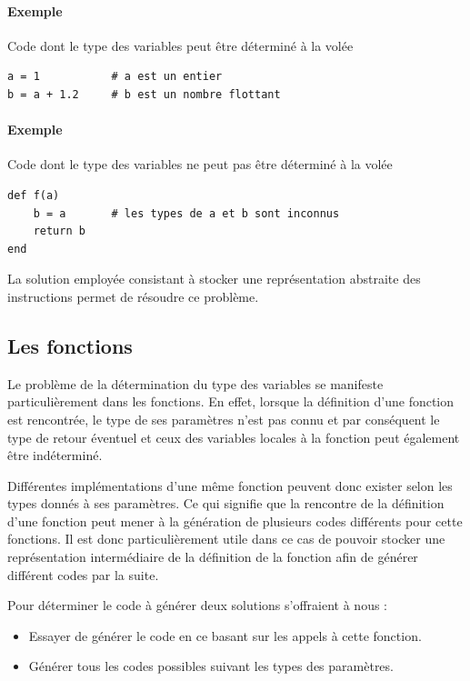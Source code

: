 \documentclass[12pt]{article}
\begin{document}
\paragraph{Exemple} Code dont le type des variables peut être déterminé à la volée
\begin{verbatim}
a = 1           # a est un entier
b = a + 1.2     # b est un nombre flottant
\end{verbatim}

\paragraph{Exemple} Code dont le type des variables ne peut pas être déterminé à la volée
\begin{verbatim}
def f(a)
    b = a       # les types de a et b sont inconnus
    return b
end 
\end{verbatim}

La solution employée consistant à stocker une représentation abstraite des instructions permet de résoudre ce problème.

\subsection{Les fonctions}

Le problème de la détermination du type des variables se manifeste particulièrement dans les fonctions. En effet, lorsque la définition d'une fonction est rencontrée, le type de ses paramètres n'est pas connu et par conséquent le type de retour éventuel et ceux des variables locales à la fonction peut également être indéterminé.

Différentes implémentations d'une même fonction peuvent donc exister selon les types donnés à ses paramètres. Ce qui signifie que la rencontre de la définition d'une fonction peut mener à la génération de plusieurs codes différents pour cette fonctions. Il est donc particulièrement utile dans ce cas de pouvoir stocker une représentation intermédiaire de la définition de la fonction afin de générer différent codes par la suite.

Pour déterminer le code à générer deux solutions s'offraient à nous :
\begin{itemize}
	\item Essayer de générer le code en ce basant sur les appels à cette fonction. 
	\item Générer tous les codes possibles suivant les types des paramètres.
\end{itemize}
\end{document}
